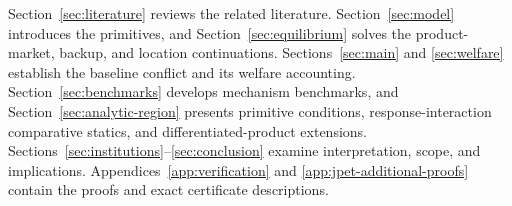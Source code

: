 Section~\ref{sec:literature} reviews the related literature. Section~\ref{sec:model} introduces the primitives, and Section~\ref{sec:equilibrium} solves the product-market, backup, and location continuations. Sections~\ref{sec:main} and \ref{sec:welfare} establish the baseline conflict and its welfare accounting. Section~\ref{sec:benchmarks} develops mechanism benchmarks, and Section~\ref{sec:analytic-region} presents primitive conditions, response-interaction comparative statics, and differentiated-product extensions. Sections~\ref{sec:institutions}--\ref{sec:conclusion} examine interpretation, scope, and implications. Appendices~\ref{app:verification} and \ref{app:jpet-additional-proofs} contain the proofs and exact certificate descriptions.
